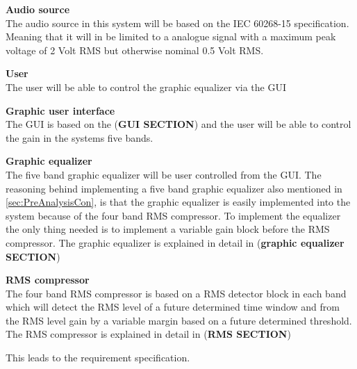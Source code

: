 \textbf{Audio source} \\
The audio source in this system will be based on the IEC 60268-15 specification. Meaning that it will in be limited to a analogue signal with a maximum peak voltage of 2 Volt RMS but otherwise nominal 0.5 Volt RMS. %

\textbf{User} \\
The user will be able to control the graphic equalizer via the GUI 

\textbf{Graphic user interface}\\
The GUI is based on the (\textbf{GUI SECTION}) and the user will be able to control the gain in the systems five bands.

\textbf{Graphic equalizer}\\
The five band graphic equalizer will be user controlled from the GUI. The reasoning behind implementing a five band graphic equalizer also mentioned in \autoref{sec:PreAnalysisCon}, is that the graphic equalizer is easily implemented into the system because of the four band RMS compressor. To implement the equalizer the only thing needed is to implement a variable gain block before the RMS compressor. The graphic equalizer is explained in detail in (\textbf{graphic equalizer SECTION}) 

\textbf{RMS compressor}\\
The four band RMS compressor is based on a RMS detector block in each band which will detect the RMS level of a future determined time window and from the RMS level gain by a variable margin based on a future determined threshold. The RMS compressor is explained in detail in (\textbf{RMS SECTION})  

This leads to the requirement specification. 


